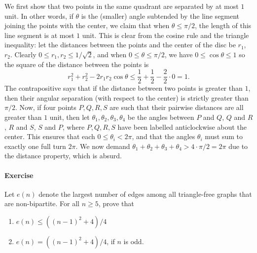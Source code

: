 \documentclass[10pt]{article}
\newcounter{prob}
\newcommand{\problem}{\stepcounter{prob}\paragraph{Exercise \arabic{prob}}}
\begin{document}
    We first show that two points in the same quadrant are separated by at most $1$
    unit. In other words, if $\theta$ is the (smaller) angle subtended by the line
    segment joining the points with the center, we claim that when $\theta \leq \pi /
    2$, the length of this line segment is at most $1$ unit. This is clear from the
    cosine rule and the triangle inequality: let the distances between the points and
    the center of the disc be $r_1$, $r_2$. Clearly $0 \leq r_1, r_2 \leq 1 /
    \sqrt{2}$, and when $0 \leq \theta \leq \pi / 2$, we have $0 \leq \cos\theta \leq
    1$ so the square of the distance between the points is \[
        r_1^2 + r_2^2 - 2r_1r_2\cos\theta \leq \frac{1}{2} + \frac{1}{2} -
        \frac{2}{2}\cdot 0 = 1.
    \] The contrapositive says that if the distance between two points is greater
    than $1$, then their angular separation (with respect to the center) is strictly
    greater than $\pi / 2$.  Now, if four points $P, Q, R, S$ are such that their
    pairwise distances are all greater than $1$ unit, then let $\theta_1, \theta_2,
    \theta_3, \theta_4$ be the angles between $P$ and $Q$, $Q$ and $R$, $R$ and $S$,
    $S$ and $P$, where $P, Q, R, S$ have been labelled anticlockwise about the
    center. This ensures that each $0 \leq \theta_i < 2\pi$, and that the angles
    $\theta_i$ must sum to exactly one full turn $2\pi$.  We now demand $\theta_1 +
    \theta_2 + \theta_3 + \theta_4 > 4\cdot \pi /2 = 2\pi$ due to the distance
    property, which is absurd.

    \problem Let $e(n)$ denote the largest number of edges among all triangle-free
    graphs that are non-bipartite. For all $n \geq 5$, prove that 
    \begin{enumerate}
        \itemsep0em
        \item $e(n) \leq ((n - 1)^2 + 4) / 4$
        \item $e(n) = ((n - 1)^2 + 4) / 4$, if $n$ is odd.
    \end{enumerate}
\end{document}
